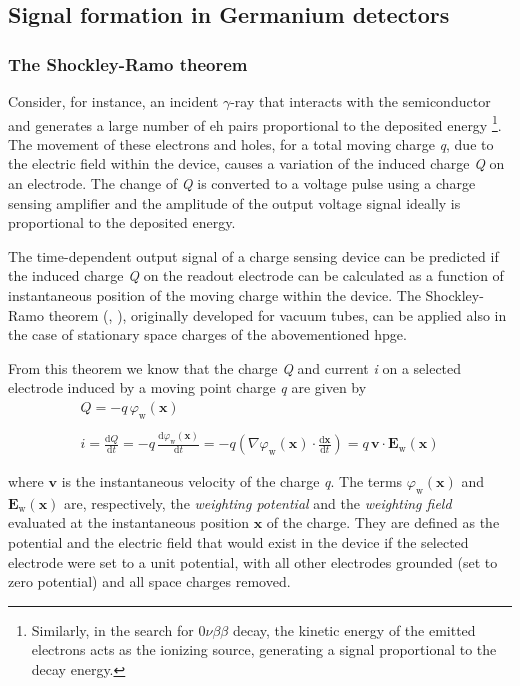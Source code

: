 \newpage

\subsection{Signal formation in Germanium detectors}
\subsubsection{The Shockley-Ramo theorem}
Consider, for instance, an incident $\gamma$-ray that interacts with the semiconductor and generates a large number of \ac{eh} pairs proportional to the deposited energy \footnote{Similarly, in the search for $0\nu\beta\beta$ decay, the kinetic energy of the emitted electrons acts as the ionizing source, generating a signal proportional to the decay energy.}. The movement of these electrons and holes, for a total moving charge \textit{q}, due to the electric field within the device, causes a variation of the induced charge \textit{Q} on an electrode. The change of \textit{Q} is converted to a voltage pulse using a charge sensing amplifier and the amplitude of the output voltage signal ideally is proportional to the deposited energy.

The time-dependent output signal of a charge sensing device can be predicted if the induced charge \textit{Q} on the readout electrode can be calculated as a function of instantaneous position of the moving charge  within the device. The Shockley-Ramo theorem (\cite{Shockley}, \cite{Ramo}), originally developed for vacuum tubes, can be applied also in the case of stationary space charges of the abovementioned \ac{hpge}. 

From this theorem we know that the charge \textit{Q} and current \textit{i} on a selected electrode induced by a moving point charge \textit{q} are given by
\begin{equation}
    \label{eq:carica-corrente-SR}
    \begin{gathered}
        Q = - q \, \varphi_\text{w} (\mathbf{x}) \\~\\
        i = \frac{\text{d}Q}{\text{d}t} = -q \, \frac{\text{d}\varphi_\text{w} (\mathbf{x})}{\text{d}t} = -q \left( \nabla \varphi_\text{w}(\mathbf{x}) \cdot \frac{\text{d}\mathbf{x}}{\text{d}t} \right) = q \, \mathbf{v} \cdot \mathbf{E}_\text{w}(\mathbf{x})
    \end{gathered}
\end{equation}

where $\mathbf{v}$ is the instantaneous velocity of the charge \textit{q}. The terms $\varphi_\text{w}(\mathbf{x})$ and $\mathbf{E}_\text{w}(\mathbf{x})$ are, respectively, the \textit{weighting potential} and the \textit{weighting field} evaluated at the instantaneous position $\mathbf{x}$ of the charge. They are defined as the potential and the electric field that would exist in the device if the selected electrode were set to a unit potential, with all other electrodes grounded (set to zero potential) and all space charges removed. \cite{GeDetectors}


